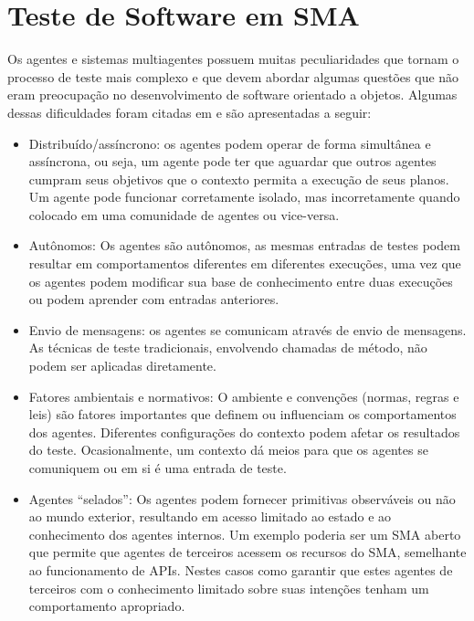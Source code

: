 \documentclass[dm,ppgcomp]{texfurg} %
\begin{document}
\section{Teste de Software em SMA}

Os agentes e sistemas multiagentes possuem muitas peculiaridades que tornam o processo de teste mais complexo e que devem abordar algumas questões que não eram preocupação no desenvolvimento de software orientado a objetos. Algumas dessas dificuldades foram citadas em \cite{rouff2002test,houhamdi2011multi,nguyen2009thesis} e são apresentadas a seguir:

\begin{itemize}
\item Distribuído/assíncrono: os agentes podem operar de forma simultânea e assíncrona, ou seja, um agente pode ter que aguardar que outros agentes cumpram seus objetivos que o contexto permita a execução de seus planos. Um agente pode funcionar corretamente isolado, mas incorretamente quando colocado em uma comunidade de agentes ou vice-versa.
\item Autônomos: Os agentes são autônomos, as mesmas entradas de testes podem resultar em comportamentos diferentes em diferentes execuções, uma vez que os agentes podem modificar sua base de conhecimento entre duas execuções ou podem aprender com entradas anteriores.
\item Envio de mensagens: os agentes se comunicam através de envio de mensagens. As técnicas de teste tradicionais, envolvendo chamadas de método, não podem ser aplicadas diretamente.
\item Fatores ambientais e normativos: O ambiente e convenções (normas, regras e leis) são fatores importantes que definem ou influenciam os comportamentos dos agentes. Diferentes configurações do contexto podem afetar os resultados do teste. Ocasionalmente, um contexto dá meios para que os agentes se comuniquem ou em si é uma entrada de teste.
\item Agentes “selados”: Os agentes podem fornecer primitivas observáveis ou não ao mundo exterior, resultando em acesso limitado ao estado e ao conhecimento dos agentes internos. Um exemplo poderia ser um SMA aberto que permite que agentes de terceiros acessem os recursos do SMA, semelhante ao funcionamento de APIs. Nestes casos como garantir que estes agentes de terceiros com o conhecimento limitado sobre suas intenções tenham um comportamento apropriado.
\end{itemize}
\end{document}
